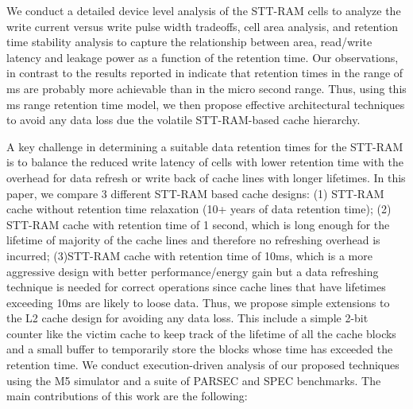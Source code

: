We conduct a  detailed device level analysis of the STT-RAM cells to analyze the write current
versus write pulse width tradeoffs, cell area analysis, and retention time stability analysis
to capture the relationship between area, read/write latency and leakage power as a function of
the retention time. Our observations, in contrast to the results reported in \cite{} indicate
that retention times in the range of ms are probably more achievable than in the micro second range.
Thus, using this ms range retention time model, we then propose effective architectural techniques to
avoid any data loss due the volatile STT-RAM-based cache hierarchy.

A key challenge in determining a suitable data retention times for the STT-RAM is to balance the
reduced write latency of cells with lower retention time with the overhead for data refresh or write
back of cache lines with longer lifetimes. In this paper, we compare 3 different STT-RAM based cache
designs: (1) STT-RAM cache without retention time relaxation (10+ years of data retention time); (2)
STT-RAM cache with retention time of 1 second, which is long enough for the lifetime of majority of
the cache lines and therefore no refreshing overhead is incurred; (3)STT-RAM cache with retention
time of 10ms, which is a more aggressive design with better performance/energy gain but a data
refreshing technique is needed for correct operations since cache lines that have lifetimes exceeding
10ms are likely to loose data. Thus, we propose simple extensions to the L2 cache design for avoiding
any data loss. This include a simple 2-bit counter like the victim cache \cite{} to keep track of the
lifetime of all the cache blocks and a small buffer to temporarily store the blocks whose time has
exceeded the retention time.
We conduct execution-driven analysis of our proposed techniques using the M5 simulator and a suite of
PARSEC and SPEC benchmarks. The main contributions of this work are the following:

